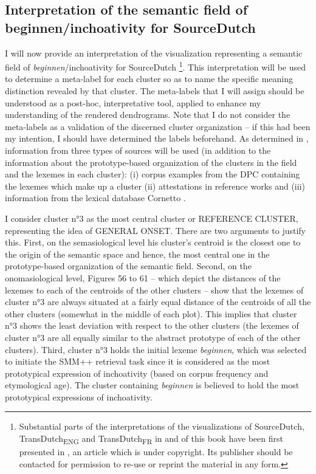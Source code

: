 \subsection{Interpretation of the semantic field of beginnen/inchoativity for SourceDutch}
\label{sec:4.2.4}  
I will now provide an interpretation of the visualization representing a semantic field of \textit{beginnen}/inchoativity for SourceDutch \footnote{Substantial parts of the interpretations of the visualizations of SourceDutch, TransDutch\textsubscript{ENG} and TransDutch\textsubscript{FR} in   and  of this book have been first presented in \citep{vandevoorde_corpus-based_2017}, an article which is under copyright. Its publisher should be contacted for permission to re-use or reprint the material in any form.}. This interpretation will be used to determine a meta-label for each cluster so as to name the specific meaning distinction revealed by that cluster. The meta-labels that I will assign should be understood as a post-hoc, interpretative tool, applied to enhance my understanding of the rendered dendrograms. Note that I do not consider the meta-labels as a validation of the discerned cluster organization – if this had been my intention, I should have determined the labels beforehand. As determined in , information from three types of sources will be used (in addition to the information about the prototype-based organization of the clusters in the field and the lexemes in each cluster): (i) corpus examples from the DPC containing the lexemes which make up a cluster (ii) attestations in reference works and (iii) information from the lexical database Cornetto \citep{vossen_cornetto_2008, spyns_cornetto:_2013}. 

I consider cluster n°3 as the most central cluster or REFERENCE CLUSTER, representing the idea of GENERAL ONSET. There are two arguments to justify this. First, on the semasiological level his cluster’s centroid is the closest one to the origin of the semantic space and hence, the most central one in the prototype-based organization of the semantic field. Second, on the onomasiological level, Figures 56 to 61 – which depict the distances of the lexemes to each of the centroids of the other clusters – show that the lexemes of cluster n°3 are always situated at a fairly equal distance of the centroids of all the other clusters (somewhat in the middle of each plot). This implies that cluster n°3 shows the least deviation with respect to the other clusters (the lexemes of cluster n°3 are all equally similar to the abstract prototype of each of the other clusters). Third, cluster n°3 holds the initial lexeme \textit{beginnen}, which was selected to initiate the SMM++ retrieval task since it is considered as the most prototypical expression of inchoativity (based on corpus frequency and etymological age). The cluster containing \textit{beginnen} is believed to hold the most prototypical expressions of inchoativity.


